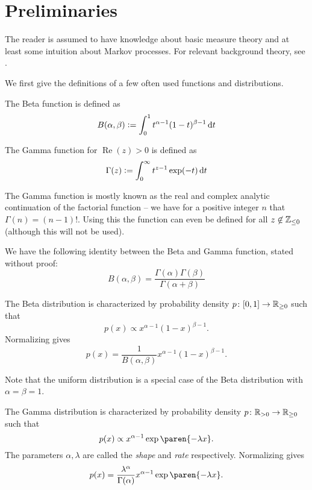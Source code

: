 \documentclass{article}
\begin{document}
\tableofcontents





\section{Preliminaries}\label{prelim}
The reader is assumed to have knowledge about basic measure theory and at least some intuition about Markov processes. For relevant background theory, see \cite{frankredig2014}.

We first give the definitions of a few often used functions and distributions.

\begin{definition}
The Beta function is defined as
\[
B(\alpha, \beta)
\vcentcolon= \int_{0}^{1} t^{\alpha-1} (1-t)^{\beta-1} \mathop{}\!\mathrm{d} t
\]
\end{definition}
\begin{definition}
The Gamma function for $\operatorname*{Re}(z) > 0$ is defined as
\[
\Gamma(z)
\vcentcolon= \int_{0}^{\infty} t^{z-1} \exp(-t) \mathop{}\!\mathrm{d} t
\]
\end{definition}

The Gamma function is mostly known as the real and complex analytic continuation of the factorial function -- we have for a positive integer $n$ that $\Gamma(n) = (n-1)!$. Using this the function can even be defined for all $z \not \in \mathbb{Z}_{\le 0}$ (although this will not be used).

We have the following identity between the Beta and Gamma function, stated without proof:
\[
B(\alpha, \beta)
= \frac{\Gamma(\alpha) \Gamma(\beta)}{\Gamma(\alpha + \beta)}
\]

\begin{definition}
The Beta distribution is characterized by probability density $p \colon [0, 1] \to \mathbb{R}_{\ge 0}$ such that
\[
p(x) \propto x^{\alpha - 1} (1-x)^{\beta - 1}.
\]
Normalizing gives
\[
p(x) = \frac{1}{B(\alpha, \beta)} x^{\alpha - 1} (1-x)^{\beta - 1}.
\]
\end{definition}

Note that the uniform distribution is a special case of the Beta distribution with $\alpha = \beta = 1$.


\begin{definition}
The Gamma distribution is characterized by probability density $p \colon \mathbb{R}_{>0} \to \mathbb{R}_{\ge 0}$ such that
\[
p(x) \propto x^{\alpha - 1} \exp\paren{-\lambda x}.
\]
The parameters $\alpha, \lambda$ are called the \emph{shape} and \emph{rate} respectively. Normalizing gives
\[
p(x) = \frac{\lambda^{\alpha}}{\Gamma(\alpha)} x^{\alpha - 1} \exp\paren{-\lambda x}.
\]
\end{definition}
\end{document}
